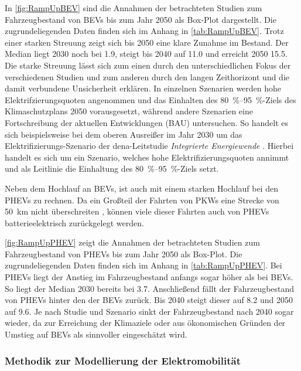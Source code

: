 In \autoref{fig:RampUpBEV} sind die Annahmen der betrachteten Studien zum Fahrzeugbestand von \glspl{BEV} bis zum Jahr \num{2050} als Box-Plot dargestellt.
Die zugrundeliegenden Daten finden sich im Anhang in \autoref{tab:RampUpBEV}.
Trotz einer starken Streuung zeigt sich bis \num{2050} eine klare Zunahme im Bestand.
Der Median liegt 2030 noch bei \SI{1.9}{\MioStk}, steigt bis \num{2040} auf \SI{11.0}{\Mio} und erreicht \num{2050} \SI{15.5}{\Mio}.
Die starke Streuung lässt sich zum einen durch den unterschiedlichen Fokus der verschiedenen Studien und zum anderen durch den langen Zeithorizont und die damit verbundene Unsicherheit erklären.
In einzelnen Szenarien werden hohe Elektrifzierungsquoten angenommen und das Einhalten des \SIrange[range-phrase=~{--}~]{80}{95}{\percent}-Ziels des Klimaschutzplans \num{2050} vorausgesetzt, während andere Szenarien eine Fortschreibung der aktuellen Entwicklungen (\gls{BAU}) untersuchen.
So handelt es sich beispielsweise bei dem oberen Ausreißer im Jahr 2030 um das Elektrifizierungs-Szenario der dena-Leitstudie \textit{Integrierte Energiewende} \cite{DEAGH2018}.
Hierbei handelt es sich um ein Szenario, welches hohe Elektrifizierungsquoten annimmt und als Leitlinie die Einhaltung des  \SIrange[range-phrase=~{--}~]{80}{95}{\percent}-Ziels setzt.\medskip

Neben dem Hochlauf an \glspl{BEV}, ist auch mit einem starken Hochlauf bei den \glspl{PHEV} zu rechnen.
Da ein Großteil der Fahrten von \glspl{PKW} eine Strecke von \SI{50}{\km} nicht überschreiten \cite{Agora2019}, können viele dieser Fahrten auch von \glspl{PHEV} batterieelektrisch zurückgelegt werden.



\autoref{fig:RampUpPHEV} zeigt die Annahmen der betrachteten Studien zum Fahrzeugbestand von \glspl{PHEV} bis zum Jahr \num{2050} als Box-Plot.
Die zugrundeliegenden Daten finden sich im Anhang in \autoref{tab:RampUpPHEV}.
Bei \glspl{PHEV} liegt der Anstieg im Fahrzeugbestand anfangs sogar höher als bei \glspl{BEV}.
So liegt der Median 2030 bereits bei \SI{3.7}{\MioStk}.
Anschließend fällt der Fahrzeugbestand von \glspl{PHEV} hinter den der \glspl{BEV} zurück.
Bis \num{2040} steigt dieser auf \SI{8.2}{\MioStk} und \num{2050} auf \SI{9.6}{\MioStk}.
Je nach Studie und Szenario sinkt der Fahrzeugbestand nach \num{2040} sogar wieder, da zur Erreichung der Klimaziele oder aus ökonomischen Gründen der Umstieg auf \glspl{BEV} als sinnvoller eingeschätzt wird.


\subsubsection{Methodik zur Modellierung der Elektromobilität}

